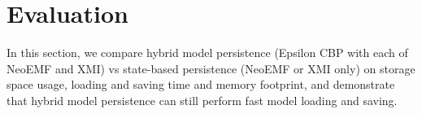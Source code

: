 \documentclass{llncs}
\begin{document}
%
%

\vspace{-15pt}
\section{Evaluation}
\label{sec:evaluation}

\vspace{-10pt}
In this section, we compare hybrid model persistence (Epsilon CBP with each of NeoEMF and XMI) vs state-based persistence (NeoEMF or XMI only) on storage space usage, loading and saving time and memory footprint, and demonstrate that hybrid model persistence can still perform fast model loading and saving. 
\end{document}

